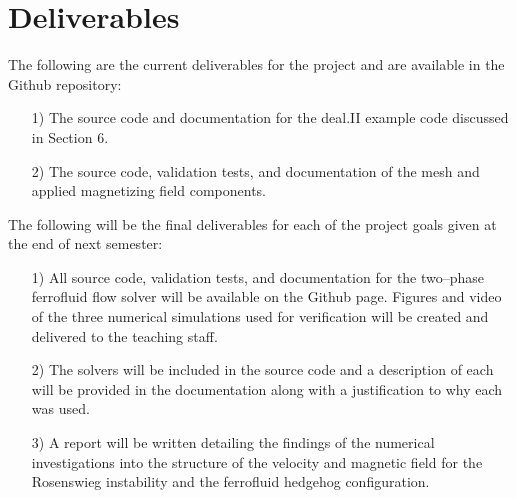 \documentclass[11pt,fullpage]{article}
\theoremstyle{lemma}
\theoremstyle{definition}
\theoremstyle{lemma}
\begin{document}
\section{Deliverables}
The following are the current deliverables for the project and are available in the Github repository:
\begin{itemize}
	\item[1)] The source code and documentation for the deal.II example code discussed in Section 6.
	
	\item[2)] The source code, validation tests, and documentation of the mesh and applied magnetizing field components.
\end{itemize}

The following will be the final deliverables for each of the project goals given at the end of next semester:
\begin{itemize}
	\item[1)] All source code, validation tests, and documentation for the two--phase ferrofluid flow solver will be available on the Github page. Figures and video of the three numerical simulations used for verification will be created and delivered to the teaching staff. 
	
	\item[2)] The solvers will be included in the source code and a description of each will be provided in the documentation along with a justification to why each was used.
	
	\item[3)] A report will be written detailing the findings of the numerical investigations into the structure of the velocity and magnetic field for the Rosenswieg instability and the ferrofluid hedgehog configuration.
\end{itemize}
\end{document}
